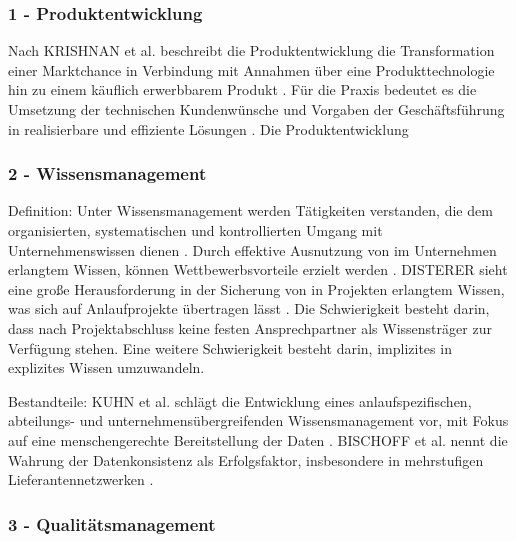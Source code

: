 \subsubsection*{1 - Produktentwicklung}
Nach KRISHNAN et al. beschreibt die Produktentwicklung die Transformation einer Marktchance in Verbindung mit Annahmen über eine Produkttechnologie hin zu einem käuflich erwerbbarem Produkt \cite{Krishnan20}. Für die Praxis bedeutet es die Umsetzung der technischen Kundenwünsche und Vorgaben der Geschäftsführung in realisierbare und effiziente Lösungen \cite[9]{Scholz2010}. 
Die Produktentwicklung 

\subsubsection*{2 - Wissensmanagement}

Definition: 
Unter Wissensmanagement werden Tätigkeiten verstanden, die dem organisierten, systematischen und kontrollierten Umgang mit Unternehmenswissen dienen \cite{Disterer2000}. Durch effektive Ausnutzung von im Unternehmen erlangtem Wissen, können Wettbewerbsvorteile erzielt werden \cite{Bischoff2007}. 
DISTERER sieht eine große Herausforderung in der Sicherung von in Projekten erlangtem Wissen, was sich auf Anlaufprojekte übertragen lässt \cite{Disterer2000}. %
Die Schwierigkeit besteht darin, dass nach Projektabschluss keine festen Ansprechpartner als Wissensträger zur Verfügung stehen. Eine weitere Schwierigkeit besteht darin, implizites in explizites Wissen umzuwandeln. %

Bestandteile: 
KUHN et al. schlägt die Entwicklung eines anlaufspezifischen, abteilungs- und unternehmensübergreifenden Wissensmanagement vor, mit Fokus auf eine menschengerechte Bereitstellung der Daten \cite{Kuhn2002}. 
BISCHOFF et al. nennt die Wahrung der Datenkonsistenz als Erfolgsfaktor, insbesondere in mehrstufigen Lieferantennetzwerken \cite{Bischoff2007}. 

\subsubsection*{3 - Qualitätsmanagement}
